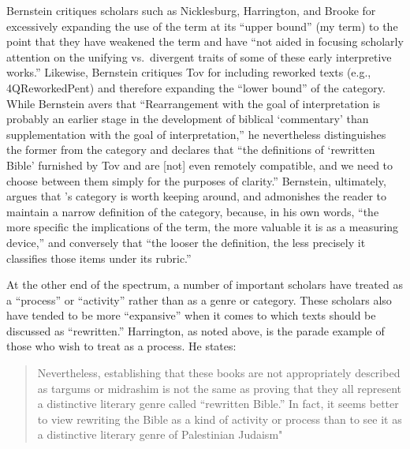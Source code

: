 Bernstein critiques scholars such as
Nicklesburg,\autocite{nickelsburg_stone1984}
Harrington,\autocite{harrington_kraft-nickelsburg1986} and
Brooke\autocite{brooke_schiffman-vanderkam2000} for excessively
expanding the use of the term \rwb at its ``upper
bound'' (my term) to the point that they have weakened the term and have
``not aided in focusing scholarly attention on the unifying
vs.~divergent traits of some of these early interpretive
works.''\autocite[179]{bernstein_textus2005} Likewise, Bernstein
critiques Tov for including reworked texts (e.g., 4QReworkedPent) and
therefore expanding the ``lower bound'' of the category. While Bernstein
avers that ``Rearrangement with the goal of interpretation is probably
an earlier stage in the development of biblical `commentary' than
supplementation with the goal of
interpretation,''\autocite[PAGE]{bernstein_textus2005} he nevertheless
distinguishes the former from the category \rwb and
declares that ``the definitions of `rewritten Bible' furnished by Tov
and \vermes are {[}not{]} even remotely compatible, and
we need to choose between them simply for the purposes of
clarity.''\autocite[185]{bernstein_textus2005} Bernstein, ultimately,
argues that \vermes's category is worth keeping around,
and admonishes the reader to maintain a narrow definition of the
category, because, in his own words, ``the more specific the
implications of the term, the more valuable it is as a measuring
device,''\autocite[195]{bernstein_textus2005} and conversely that ``the
looser the definition, the less precisely it classifies those items
under its rubric.'' \autocite[195]{bernstein_textus2005}

At the other end of the spectrum, a number of important scholars have
treated \rwb as a ``process'' or ``activity'' rather
than as a genre or category. These scholars also have tended to be more
``expansive'' when it comes to which texts should be discussed as
``rewritten.'' Harrington, as noted above, is the parade example of
those who wish to treat \rwb as a process. He states:

\begin{quote}
Nevertheless, establishing that these books are not appropriately
described as targums or midrashim is not the same as proving that they
all represent a distinctive literary genre called ``rewritten Bible.''
In fact, it seems better to view rewriting the Bible as a kind of
activity or process than to see it as a distinctive literary genre of
Palestinian
Judaism"\autocite[242--243]{harrington_kraft-nickelsburg1986}
\end{quote}

